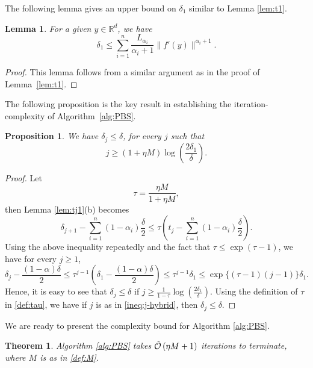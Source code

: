 \documentclass[11pt,letterpaper]{article}
\newtheorem{theorem}[thm]{Theorem}
\newtheorem{lemma}[thm]{Lemma}
\newtheorem{proposition}[thm]{Proposition}
\newcommand{\R}{\mathbb{R}}
\begin{document}
The following lemma gives an upper bound on $\delta_1$ similar to Lemma \ref{lem:t1}.
	
\begin{lemma}\label{lem:t1-hybrid}
For a given $y\in \R^d$, we have
\[
\delta_1 \le \sum_{i=1}^n \frac{L_{\alpha_i}}{\alpha_i+1} \|f'(y)\|^{\alpha_i+1}.
\]
\end{lemma}

\begin{proof}
This lemma follows from a similar argument as in the proof of Lemma~\ref{lem:t1}.
\end{proof}

The following proposition is the key result in establishing the iteration-complexity of Algorithm~\ref{alg:PBS}.

\begin{proposition}\label{prop:null} 
		We have $\delta_j\le \delta$, for every $j$ such that
		\begin{equation}\label{ineq:j-hybrid}
		    j \ge (1+ \eta M ) \log\left( \frac{2  \delta_1}{\delta}\right).
		\end{equation}
	\end{proposition}
    
	\begin{proof}
        Let 
        \begin{equation}\label{def:tau}
            \tau = \frac{\eta M}{1+\eta M},
        \end{equation}
        then Lemma \ref{lem:tj1}(b) becomes
        \[
        \delta_{j+1} - \sum_{i=1}^n(1-\alpha_i)\frac{\delta}{2} \le \tau \left(t_{j} - \sum_{i=1}^n(1-\alpha_i)\frac{\delta}{2}\right).
        \]
	    Using the above inequality repeatedly and the fact that $\tau \le \exp(\tau-1)$, we have for every $j \ge 1$,
		\[
		\delta_j - \frac{(1-\alpha)\delta}2 \le \tau^{j-1}\left(\delta_1 - \frac{(1-\alpha)\delta}2 \right) \le \tau^{j-1}\delta_1 \le \exp\{(\tau-1) (j-1)\} \delta_1. 
		\]
		Hence, it is easy to see that $\delta_j\le \delta$ if $j\ge \frac{1}{1-\tau} \log\left( \frac{2  \delta_1}{\delta}\right)$.
		Using the definition of $\tau$ in \eqref{def:tau}, we have if $j$ is as in \eqref{ineq:j-hybrid}, then $\delta_j\le \delta$.
    \end{proof}

We are ready to present the complexity bound for Algorithm \ref{alg:PBS}. 

\begin{theorem}\label{thm:bundle-hybrid}
Algorithm \ref{alg:PBS} takes $\tilde {\cal O}\left(\eta M + 1\right)$ iterations to terminate, where $M$ is as in \eqref{def:M}.
\end{theorem}
\end{document}
